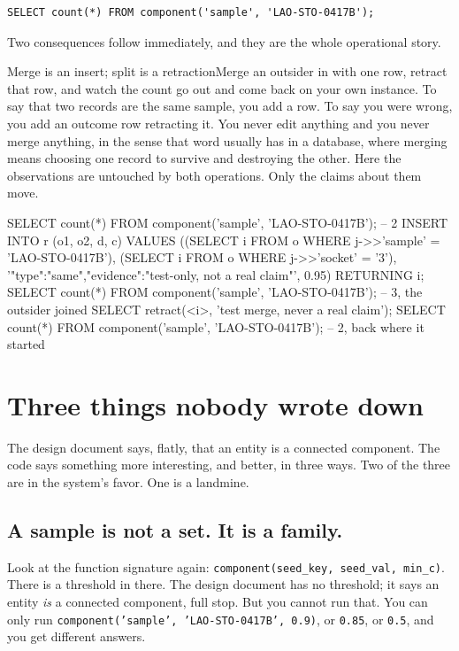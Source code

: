 \begin{lstlisting}
SELECT count(*) FROM component('sample', 'LAO-STO-0417B');
\end{lstlisting}

Two consequences follow immediately, and they are the whole operational story.

\begin{Correspondence}{Merge is an insert; split is a retraction}{Merge an outsider in with one row, retract that row, and watch the count go out and come back on your own instance.}
To say that two records are the same sample, you add a row. To say you were wrong, you add an outcome row retracting it. You never edit anything and you never merge anything, in the sense that word usually has in a database, where merging means choosing one record to survive and destroying the other. Here the observations are untouched by both operations. Only the claims about them move.
\begin{Check}
SELECT count(*) FROM component('sample', 'LAO-STO-0417B');   -- 2
INSERT INTO r (o1, o2, d, c) VALUES
  ((SELECT i FROM o WHERE j->>'sample' = 'LAO-STO-0417B'),
   (SELECT i FROM o WHERE j->>'socket' = '3'),
   '{"type":"same","evidence":"test-only, not a real claim"}', 0.95)
RETURNING i;
SELECT count(*) FROM component('sample', 'LAO-STO-0417B');   -- 3, the outsider joined
SELECT retract(<i>, 'test merge, never a real claim');
SELECT count(*) FROM component('sample', 'LAO-STO-0417B');   -- 2, back where it started
\end{Check}
\end{Correspondence}

\section{Three things nobody wrote down}

The design document says, flatly, that an entity is a connected component. The code says something more interesting, and better, in three ways. Two of the three are in the system's favor. One is a landmine.

\subsection{A sample is not a set. It is a family.}

Look at the function signature again: \texttt{component(seed\_key, seed\_val, min\_c)}. There is a threshold in there. The design document has no threshold; it says an entity \emph{is} a connected component, full stop. But you cannot run that. You can only run \texttt{component('sample', 'LAO-STO-0417B', 0.9)}, or \texttt{0.85}, or \texttt{0.5}, and you get different answers.

